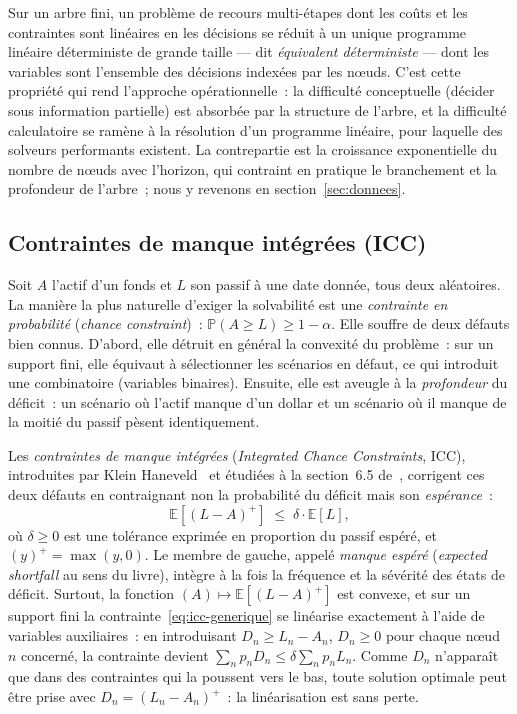 \documentclass[11pt,letterpaper]{article}
\newcommand{\E}{\mathbb{E}}
\newcommand{\prob}{\mathbb{P}}
\newcommand{\pos}[1]{\left(#1\right)^{+}}
\theoremstyle{definition}
\begin{document}
Sur un arbre fini, un problème de recours multi-étapes dont les coûts et les
contraintes sont linéaires en les décisions se réduit à un unique programme
linéaire déterministe de grande taille --- dit \emph{équivalent déterministe} ---
dont les variables sont l'ensemble des décisions indexées par les n\oe uds. C'est
cette propriété qui rend l'approche opérationnelle~: la difficulté conceptuelle
(décider sous information partielle) est absorbée par la structure de l'arbre, et
la difficulté calculatoire se ramène à la résolution d'un programme linéaire, pour
laquelle des solveurs performants existent. La contrepartie est la croissance
exponentielle du nombre de n\oe uds avec l'horizon, qui contraint en pratique le
branchement et la profondeur de l'arbre~; nous y revenons en
section~\ref{sec:donnees}.

\subsection{Contraintes de manque intégrées (ICC)}\label{ssec:icc}

Soit $A$ l'actif d'un fonds et $L$ son passif à une date donnée, tous deux
aléatoires. La manière la plus naturelle d'exiger la solvabilité est une
\emph{contrainte en probabilité} (\emph{chance constraint})~:
$\prob(A \ge L) \ge 1 - \alpha$. Elle souffre de deux défauts bien connus. D'abord,
elle détruit en général la convexité du problème~: sur un support fini, elle
équivaut à sélectionner les scénarios en défaut, ce qui introduit une combinatoire
(variables binaires). Ensuite, elle est aveugle à la \emph{profondeur} du
déficit~: un scénario où l'actif manque d'un dollar et un scénario où il manque de
la moitié du passif pèsent identiquement.

Les \emph{contraintes de manque intégrées} (\emph{Integrated Chance Constraints},
ICC), introduites par Klein Haneveld~\cite{KH1986} et étudiées à la
section~6.5 de~\cite{KHvdVR2020}, corrigent ces deux défauts en
contraignant non la probabilité du déficit mais son \emph{espérance}~:
\begin{equation}\label{eq:icc-generique}
\E\!\left[\pos{L - A}\right] \;\le\; \delta \cdot \E[L],
\end{equation}
où $\delta \ge 0$ est une tolérance exprimée en proportion du passif espéré, et
$\pos{y} = \max(y, 0)$. Le membre de gauche, appelé \emph{manque espéré}
(\emph{expected shortfall} au sens du livre), intègre à la fois la fréquence et la
sévérité des états de déficit. Surtout, la fonction
$(A) \mapsto \E[\pos{L - A}]$ est convexe, et sur un support fini la
contrainte~\eqref{eq:icc-generique} se linéarise exactement à l'aide de variables
auxiliaires~: en introduisant $D_n \ge L_n - A_n$, $D_n \ge 0$ pour chaque n\oe ud
$n$ concerné, la contrainte devient $\sum_n p_n D_n \le \delta \sum_n p_n L_n$.
Comme $D_n$ n'apparaît que dans des contraintes qui la poussent vers le bas, toute
solution optimale peut être prise avec $D_n = \pos{L_n - A_n}$~: la linéarisation
est sans perte.
\end{document}
